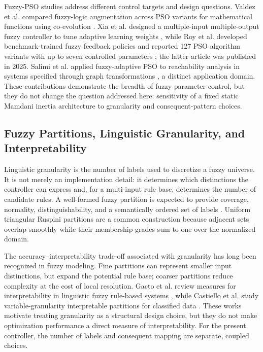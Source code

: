 Fuzzy-PSO studies address different control targets and design questions. Valdez et al. compared fuzzy-logic augmentation across PSO variants for mathematical functions using co-evolution \cite{Valdez2017}. Xia et al. designed a multiple-input multiple-output fuzzy controller to tune adaptive learning weights \cite{Xia2023}, while Roy et al. developed benchmark-trained fuzzy feedback policies and reported 127 PSO algorithm variants with up to seven controlled parameters \cite{Roy2024}; the latter article was published in 2025. Salimi et al. applied fuzzy-adaptive PSO to reachability analysis in systems specified through graph transformations \cite{Salimi2025}, a distinct application domain. These contributions demonstrate the breadth of fuzzy parameter control, but they do not change the question addressed here: sensitivity of a fixed static Mamdani inertia architecture to granularity and consequent-pattern choices.

\subsection{Fuzzy Partitions, Linguistic Granularity, and Interpretability}
\label{subsec:granularity}

Linguistic granularity is the number of labels used to discretize a fuzzy universe. It is not merely an implementation detail: it determines which distinctions the controller can express and, for a multi-input rule base, determines the number of candidate rules. A well-formed fuzzy partition is expected to provide coverage, normality, distinguishability, and a semantically ordered set of labels \cite{Klir2005,DuboisPrade2000}. Uniform triangular Ruspini partitions are a common construction because adjacent sets overlap smoothly while their membership grades sum to one over the normalized domain.

The accuracy--interpretability trade-off associated with granularity has long been recognized in fuzzy modeling. Fine partitions can represent smaller input distinctions, but expand the potential rule base; coarser partitions reduce complexity at the cost of local resolution. Gacto et al. review measures for interpretability in linguistic fuzzy rule-based systems \cite{Gacto2011}, while Castiello et al. study variable-granularity interpretable partitions for classified data \cite{Castiello2019}. These works motivate treating granularity as a structural design choice, but they do not make optimization performance a direct measure of interpretability. For the present controller, the number of labels and consequent mapping are separate, coupled choices.

